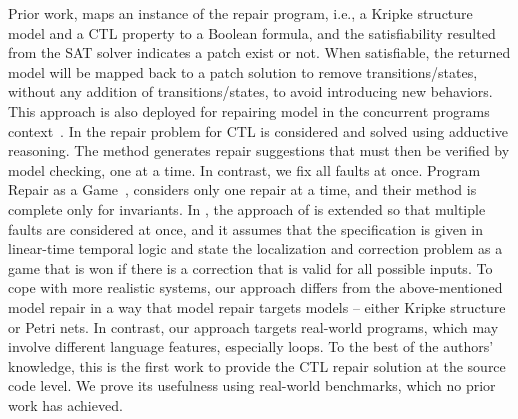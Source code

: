 


Prior work, \cite{DBLP:conf/memocode/AttieCBSS15} maps an instance of the repair program, i.e., a Kripke structure model and a CTL property to a Boolean formula, and the satisfiability resulted from the SAT solver indicates a patch exist or not. When satisfiable, the returned model will be mapped back to a patch solution to remove transitions/states, 
without any addition of transitions/states, to avoid introducing new behaviors. 
This approach is also deployed for repairing model in the concurrent programs context~\cite{DBLP:conf/fossacs/AttieC23}.  
In \cite{DBLP:journals/ai/BuccafurriEGL99} the repair problem for CTL is considered and solved using adductive reasoning. The method generates repair suggestions that must then be
verified by model checking, one at a time. In contrast, we fix all faults at
once. 
Program Repair as a Game~\cite{DBLP:conf/cav/JobstmannGB05}, 
considers only one repair at a time, and their method is complete only for invariants. 
In 
\cite{DBLP:conf/charme/StaberJB05} , the approach of \cite{DBLP:conf/cav/JobstmannGB05} is extended so that multiple faults are considered at once, and 
it assumes that the specification is given in linear-time
temporal logic and state the localization and correction problem as a game that
is won if there is a correction that is valid for all possible inputs. 
To cope with more realistic systems, 
our approach differs from the above-mentioned model repair in a way that model repair targets models -- either Kripke structure or Petri nets. In contrast, our approach targets 
real-world programs, which may involve different language features, especially loops. 
To the best of the authors' knowledge, this is the first work to provide the CTL repair solution at the source code level. We prove its usefulness using real-world benchmarks, which no prior work has achieved. 

\vspace{-1mm}